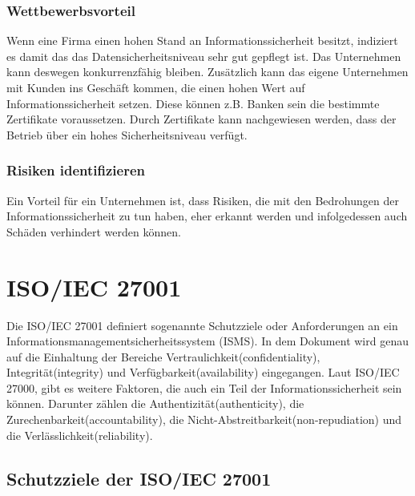\subsubsection{Wettbewerbsvorteil}
Wenn eine Firma einen hohen Stand an Informationssicherheit besitzt, indiziert es damit das das Datensicherheitsniveau sehr gut gepflegt ist. Das Unternehmen kann deswegen konkurrenzfähig bleiben. Zusätzlich kann das eigene Unternehmen mit Kunden ins Geschäft kommen, die einen hohen Wert auf Informationssicherheit setzen. Diese können z.B. Banken sein die bestimmte Zertifikate voraussetzen.
Durch Zertifikate kann nachgewiesen werden, dass der Betrieb über ein hohes Sicherheitsniveau verfügt.

\subsubsection{Risiken identifizieren}
Ein Vorteil für ein Unternehmen ist, dass Risiken, die mit den Bedrohungen der Informationssicherheit zu tun haben, eher erkannt werden und infolgedessen auch Schäden verhindert werden können.

\section{ISO/IEC 27001}
Die ISO/IEC 27001 definiert sogenannte Schutzziele oder Anforderungen an ein Informationsmanagementsicherheitssystem (ISMS). In dem Dokument wird genau auf die Einhaltung der Bereiche Vertraulichkeit(confidentiality), Integrität(integrity) und Verfügbarkeit(availability) eingegangen. Laut ISO/IEC 27000, gibt es weitere Faktoren, die auch ein Teil der Informationssicherheit sein können. Darunter zählen die Authentizität(authenticity), die Zurechenbarkeit(accountability), die Nicht-Abstreitbarkeit(non-repudiation) und die Verlässlichkeit(reliability).

\subsection{Schutzziele der ISO/IEC 27001}
